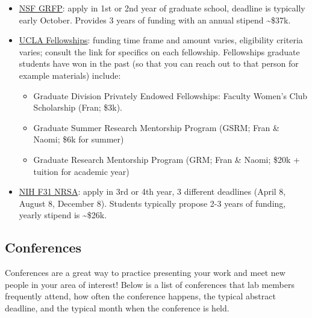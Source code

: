 \documentclass[
]{book}
\providecommand{\tightlist}{%
  \setlength{\itemsep}{0pt}\setlength{\parskip}{0pt}}
\begin{document}
\begin{itemize}
\tightlist
\item
  \href{https://www.nsfgrfp.org/}{NSF GRFP}: apply in 1st or 2nd year of graduate school, deadline is typically early October. Provides 3 years of funding with an annual stipend \textasciitilde\$37k.
\item
  \href{https://grad.ucla.edu/asis/stusup/gradsupport.pdf}{UCLA Fellowships}: funding time frame and amount varies, eligibility criteria varies; consult the link for specifics on each fellowship. Fellowships graduate students have won in the past (so that you can reach out to that person for example materials) include:

  \begin{itemize}
  \tightlist
  \item
    Graduate Division Privately Endowed Fellowships: Faculty Women's Club Scholarship (Fran; \$3k).
  \item
    Graduate Summer Research Mentorship Program (GSRM; Fran \& Naomi; \$6k for summer)
  \item
    Graduate Research Mentorship Program (GRM; Fran \& Naomi; \$20k + tuition for academic year)
  \end{itemize}
\item
  \href{https://www.nia.nih.gov/research/training/f31-individual-fellowships-phd-students}{NIH F31 NRSA}: apply in 3rd or 4th year, 3 different deadlines (April 8, August 8, December 8). Students typically propose 2-3 years of funding, yearly stipend is \textasciitilde\$26k.
\end{itemize}

\hypertarget{conferences}{%
\subsection{Conferences}\label{conferences}}

Conferences are a great way to practice presenting your work and meet new people in your area of interest! Below is a list of conferences that lab members frequently attend, how often the conference happens, the typical abstract deadline, and the typical month when the conference is held.
\end{document}
